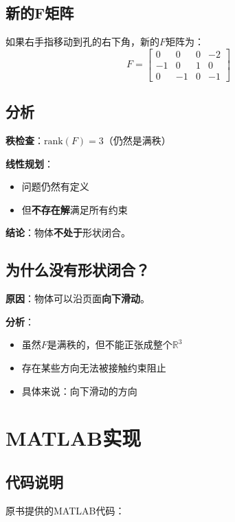 \documentclass[12pt,a4paper]{article}
\begin{document}
\subsection{新的F矩阵}

如果右手指移动到孔的右下角，新的$F$矩阵为：
\begin{equation}
F = \begin{bmatrix}
0 & 0 & 0 & -2 \\
-1 & 0 & 1 & 0 \\
0 & -1 & 0 & -1
\end{bmatrix}
\end{equation}

\subsection{分析}

\textbf{秩检查}：$\text{rank}(F) = 3$（仍然是满秩）

\textbf{线性规划}：
\begin{itemize}
\item 问题仍然有定义
\item 但\textbf{不存在解}满足所有约束
\end{itemize}

\textbf{结论}：物体\textbf{不处于}形状闭合。

\subsection{为什么没有形状闭合？}

\textbf{原因}：物体可以沿页面\textbf{向下滑动}。

\textbf{分析}：
\begin{itemize}
\item 虽然$F$是满秩的，但不能正张成整个$\mathbb{R}^3$
\item 存在某些方向无法被接触约束阻止
\item 具体来说：向下滑动的方向
\end{itemize}

\section{MATLAB实现}

\subsection{代码说明}

原书提供的MATLAB代码：
\end{document}
